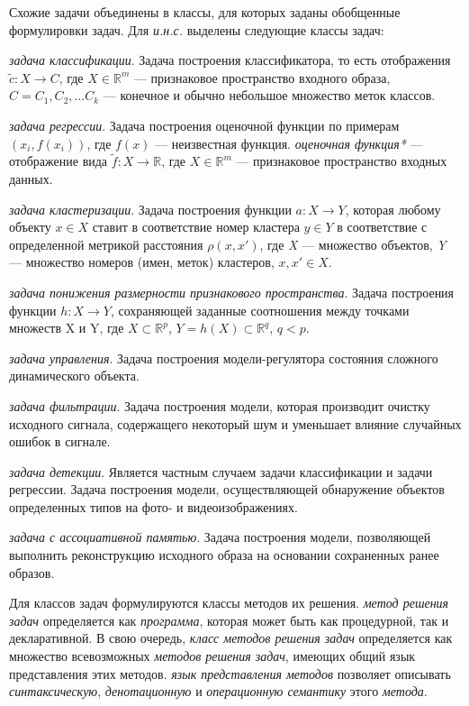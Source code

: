 Схожие задачи объединены в классы, для которых заданы обобщенные формулировки задач. Для \textit{и.н.с.} выделены следующие классы задач:
\begin{textitemize}
	\item \textit{задача классификации}. Задача построения классификатора, то есть отображения $\tilde c: X \rightarrow C$, где $ X \in \mathbb{R}^m$ --- признаковое пространство входного образа, $C = {C_1, C_2, ...C_k }$ --- конечное и обычно небольшое множество меток классов.
	\item \textit{задача регрессии}. Задача построения оценочной функции по примерам $(x_i, f(x_i))$, где $f(x)$ --- неизвестная функция. \textit{оценочная функция*} --- отображение вида $\tilde{f}: X \rightarrow \mathbb{R}$, где $X \in \mathbb{R}^m$ --- признаковое пространство входных данных.
	\item \textit{задача кластеризации}. Задача построения функции $a: X \rightarrow Y$, которая любому объекту $x \in X$ ставит в соответствие номер кластера $y \in Y$ в соответствие с определенной метрикой расстояния $\rho(x, x')$, где \textit{X} --- множество объектов, \textit{Y} --- множество номеров (имен, меток) кластеров, $x, x' \in X$.
	\item \textit{задача понижения размерности признакового пространства}. Задача построения функции $h: X \rightarrow Y$, сохраняющей заданные соотношения между точками множеств X и Y, где $X \subset \mathbb{R}^p$, $Y=h(X) \subset \mathbb{R}^q$, $q < p$.
	\item \textit{задача управления}. Задача построения модели-регулятора состояния сложного динамического объекта.
	\item \textit{задача фильтрации}. Задача построения модели, которая производит очистку исходного сигнала, содержащего некоторый шум и уменьшает влияние случайных ошибок в сигнале.
	\item \textit{задача детекции}. Является частным случаем задачи классификации и задачи регрессии. Задача построения модели, осуществляющей обнаружение объектов определенных типов на фото- и видеоизображениях.
	\item \textit{задача с ассоциативной памятью}. Задача построения модели, позволяющей выполнить реконструкцию исходного образа на основании сохраненных ранее образов.
\end{textitemize}

Для классов задач формулируются классы методов их решения. \textit{метод решения задач} определяется как \textit{программа}, которая может быть как процедурной, так и декларативной. В свою очередь, \textit{класс методов решения задач} определяется как множество всевозможных \textit{методов решения задач}, имеющих общий язык представления этих методов. \textit{язык представления методов} позволяет описывать \textit{синтаксическую}, \textit{денотационную} и \textit{операционную семантику} этого \textit{метода}.

